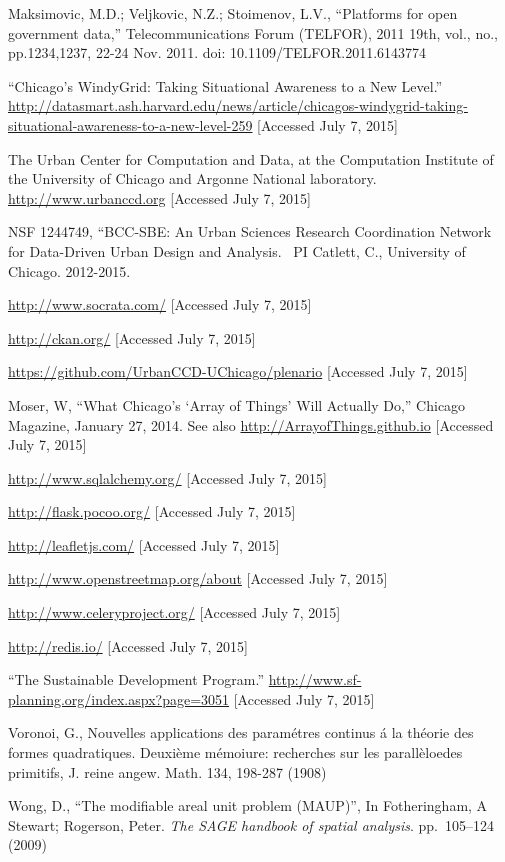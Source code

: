 \documentclass[11pt]{article}
\begin{document}
\begin{thebibliography}{1}

Maksimovic, M.D.; Veljkovic, N.Z.; Stoimenov, L.V., ``Platforms for open government data,'' Telecommunications Forum (TELFOR), 2011 19th, vol., no., pp.1234,1237, 22-24 Nov. 2011. doi: 10.1109/TELFOR.2011.6143774

``Chicago's WindyGrid: Taking Situational Awareness to a New Level.'' \url{http://datasmart.ash.harvard.edu/news/article/chicagos-windygrid-taking-situational-awareness-to-a-new-level-259} [Accessed July 7, 2015]

The Urban Center for Computation and Data, at the Computation Institute of the University of Chicago and Argonne National laboratory. \url{http://www.urbanccd.org} [Accessed July 7, 2015]

NSF 1244749, ``BCC-SBE: An Urban Sciences Research Coordination Network for Data-Driven Urban Design and Analysis. \ PI Catlett, C., University of Chicago. 2012-2015.

\url{http://www.socrata.com/} [Accessed July 7, 2015]

\url{http://ckan.org/} [Accessed July 7, 2015]

\url{https://github.com/UrbanCCD-UChicago/plenario} [Accessed July 7, 2015]

Moser, W, ``What Chicago's `Array of Things' Will Actually Do,'' Chicago Magazine, January 27, 2014. See also \url{http://ArrayofThings.github.io} [Accessed July 7, 2015]

\url{http://www.sqlalchemy.org/} [Accessed July 7, 2015]

\url{http://flask.pocoo.org/} [Accessed July 7, 2015]

\url{http://leafletjs.com/} [Accessed July 7, 2015]

\url{http://www.openstreetmap.org/about} [Accessed July 7, 2015]

\url{http://www.celeryproject.org/} [Accessed July 7, 2015]

\url{http://redis.io/} [Accessed July 7, 2015]

``The Sustainable Development Program.'' \url{http://www.sf-planning.org/index.aspx?page=3051} [Accessed July 7, 2015]

Voronoi, G., Nouvelles applications des param\'etres continus \'a la th\'eorie des formes quadratiques. Deuxi\`eme m\'emoiure: recherches sur les parall\`eloedes primitifs, J. reine angew. Math. 134, 198-287 (1908)

Wong, D., ``The modifiable areal unit problem (MAUP)'', In Fotheringham, A Stewart; Rogerson, Peter. \textit{The SAGE handbook of spatial analysis}. pp.~105--124 (2009)

\end{thebibliography}
\end{document}
